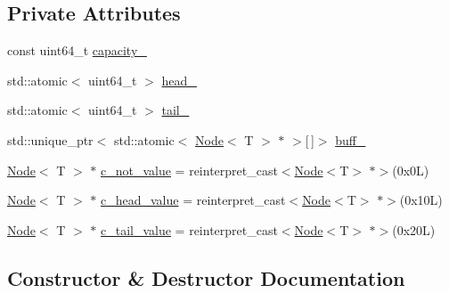 \subsection*{Private Attributes}
\begin{DoxyCompactItemize}
\item 
const uint64\+\_\+t \hyperlink{classtervel_1_1containers_1_1lf_1_1mcas__buffer_1_1_ring_buffer_a2dec70fe03eabf7ed3c95fdb4d736364}{capacity\+\_\+}
\item 
std\+::atomic$<$ uint64\+\_\+t $>$ \hyperlink{classtervel_1_1containers_1_1lf_1_1mcas__buffer_1_1_ring_buffer_aef0ab31a637a528455eacf22dba2ffa4}{head\+\_\+}
\item 
std\+::atomic$<$ uint64\+\_\+t $>$ \hyperlink{classtervel_1_1containers_1_1lf_1_1mcas__buffer_1_1_ring_buffer_a97b76531afff0036f143fccf090a8cc6}{tail\+\_\+}
\item 
std\+::unique\+\_\+ptr$<$ std\+::atomic$<$ \hyperlink{classtervel_1_1containers_1_1lf_1_1mcas__buffer_1_1_node}{Node}$<$ T $>$ $\ast$ $>$\mbox{[}$\,$\mbox{]}$>$ \hyperlink{classtervel_1_1containers_1_1lf_1_1mcas__buffer_1_1_ring_buffer_a4201cea40aa6be635258f63e6d937a65}{buff\+\_\+}
\item 
\hyperlink{classtervel_1_1containers_1_1lf_1_1mcas__buffer_1_1_node}{Node}$<$ T $>$ $\ast$ \hyperlink{classtervel_1_1containers_1_1lf_1_1mcas__buffer_1_1_ring_buffer_ad1289b761a9c2d47d0f0421f5ccf07bf}{c\+\_\+not\+\_\+value} = reinterpret\+\_\+cast$<$\hyperlink{classtervel_1_1containers_1_1lf_1_1mcas__buffer_1_1_node}{Node}$<$T$>$ $\ast$$>$(0x0\+L)
\item 
\hyperlink{classtervel_1_1containers_1_1lf_1_1mcas__buffer_1_1_node}{Node}$<$ T $>$ $\ast$ \hyperlink{classtervel_1_1containers_1_1lf_1_1mcas__buffer_1_1_ring_buffer_ac51e6a1318dad56bc27f1dc709f90f23}{c\+\_\+head\+\_\+value} = reinterpret\+\_\+cast$<$\hyperlink{classtervel_1_1containers_1_1lf_1_1mcas__buffer_1_1_node}{Node}$<$T$>$ $\ast$$>$(0x10\+L)
\item 
\hyperlink{classtervel_1_1containers_1_1lf_1_1mcas__buffer_1_1_node}{Node}$<$ T $>$ $\ast$ \hyperlink{classtervel_1_1containers_1_1lf_1_1mcas__buffer_1_1_ring_buffer_a87837a56d7b80c5fdc81fd3a22c4f470}{c\+\_\+tail\+\_\+value} = reinterpret\+\_\+cast$<$\hyperlink{classtervel_1_1containers_1_1lf_1_1mcas__buffer_1_1_node}{Node}$<$T$>$ $\ast$$>$(0x20\+L)
\end{DoxyCompactItemize}


\subsection{Constructor \& Destructor Documentation}
\hypertarget{classtervel_1_1containers_1_1lf_1_1mcas__buffer_1_1_ring_buffer_af42278e7ae36bc016c471da6ee40b1a1}{}
